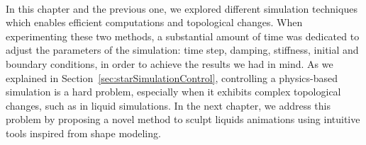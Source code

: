\paragraph*{}
In this chapter and the previous one, we explored different simulation techniques which enables efficient computations and topological changes. 
When experimenting these two methods, a substantial amount of time was dedicated to adjust the parameters of the simulation: time step, damping, stiffness, initial and boundary conditions, in order to achieve the results we had in mind.
As we explained in Section~\ref{sec:starSimulationControl}, controlling a physics-based simulation is a hard problem, especially when it exhibits complex topological changes, such as in liquid simulations.
In the next chapter, we address this problem by proposing a novel method to sculpt liquids animations using intuitive tools inspired from shape modeling.
